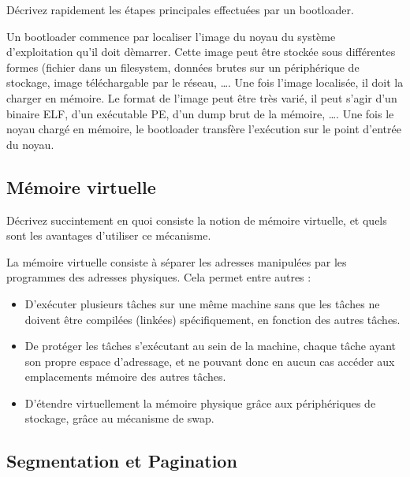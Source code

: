 D\'ecrivez rapidement les \'etapes principales effectu\'ees par un bootloader.

\begin{correction}

Un bootloader commence par localiser l'image du noyau du syst\`eme
d'exploitation qu'il doit d\`emarrer. Cette image peut \^etre stock\'ee sous
diff\'erentes formes (fichier dans un filesystem, donn\'ees brutes sur un
p\'eriph\'erique de stockage, image t\'el\'echargable par le r\'eseau, \ldots.
Une fois l'image localis\'ee, il doit la charger en m\'emoire. Le format de
l'image peut \^etre tr\`es vari\'e, il peut s'agir d'un binaire ELF, d'un
ex\'ecutable PE, d'un dump brut de la m\'emoire, \ldots.
Une fois le noyau charg\'e en m\'emoire, le bootloader transf\`ere
l'ex\'ecution sur le point d'entr\'ee du noyau.

\end{correction}

\subsection{M\'emoire virtuelle
            }

D\'ecrivez succintement en quoi consiste la notion de m\'emoire virtuelle, et
quels sont les avantages d'utiliser ce m\'ecanisme.

\begin{correction}

La m\'emoire virtuelle consiste \`a s\'eparer les adresses manipul\'ees par les
programmes des adresses physiques. Cela permet entre autres :
\begin{itemize}
\item D'ex\'ecuter plusieurs t\^aches sur une m\^eme machine sans que les
t\^aches ne doivent \^etre compil\'ees (link\'ees) sp\'ecifiquement, en
fonction des autres t\^aches.
\item De prot\'eger les t\^aches s'ex\'ecutant au sein de la machine, chaque
t\^ache ayant son propre espace d'adressage, et ne pouvant donc en aucun cas
acc\'eder aux emplacements m\'emoire des autres t\^aches.
\item D'\'etendre virtuellement la m\'emoire physique gr\^ace aux
p\'eriph\'eriques de stockage, gr\^ace au m\'ecanisme de swap.
\end{itemize}

\end{correction}

\subsection{Segmentation et Pagination
            }


